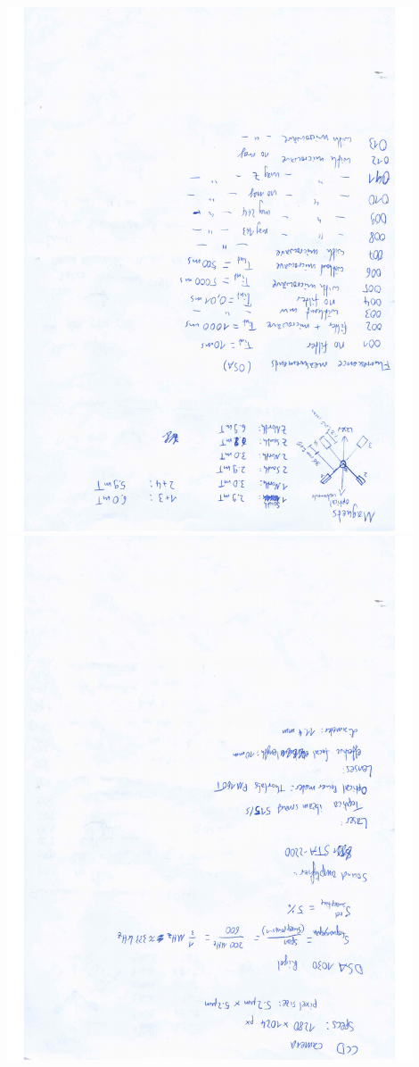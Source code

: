\includegraphics[width=0.9\textwidth,angle=180]{../labbook/labbook-3.pdf}
\includegraphics[width=0.9\textwidth,angle=180]{../labbook/labbook-4.pdf}
